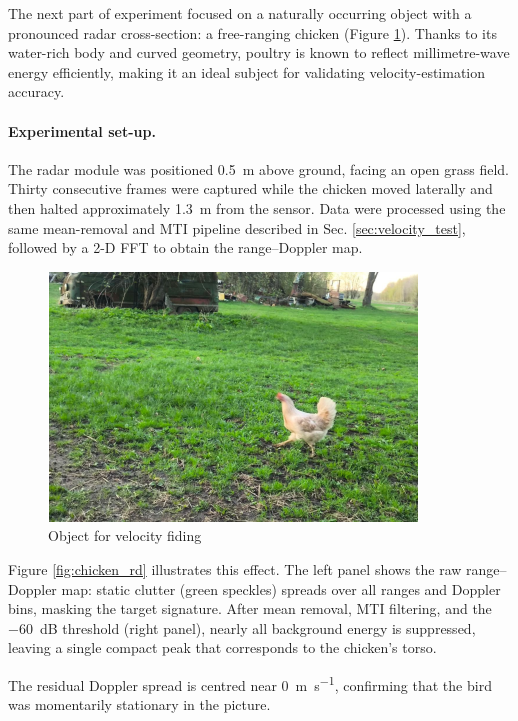 The next part of experiment focused on a naturally occurring object with a pronounced radar cross-section: a free-ranging chicken (Figure \ref{fig:chicken}).  Thanks to its water-rich body and curved geometry, poultry is known to reflect millimetre-wave energy efficiently, making it an ideal subject for validating velocity-estimation accuracy.

\paragraph{Experimental set-up.}
The radar module was positioned \SI{0.5}{m} above ground, facing an open grass field.  
Thirty consecutive frames were captured while the chicken moved laterally and then halted approximately \SI{1.3}{m} from the sensor.  Data were processed using the same mean-removal and MTI pipeline described in Sec. \ref{sec:velocity_test}, followed by a 2-D FFT to obtain the range–Doppler map.


\begin{figure}[H]
    \centering
    \includegraphics[width=0.5\linewidth]{Src/images/Chocken.png}
    \caption{Object for velocity fiding}
    \label{fig:chicken}
\end{figure}

Figure \ref{fig:chicken_rd} illustrates this effect.  
The left panel shows the raw range–Doppler map: static clutter (green speckles) spreads over all ranges and Doppler bins, masking the target signature.  
After mean removal, MTI filtering, and the \SI{-60}{dB} threshold (right panel), nearly all background energy is suppressed, leaving a single compact peak that corresponds to the chicken’s torso. 


The residual Doppler spread is centred near \SI{0}{\metre\per\second}, confirming that the bird was momentarily stationary in the picture.  


